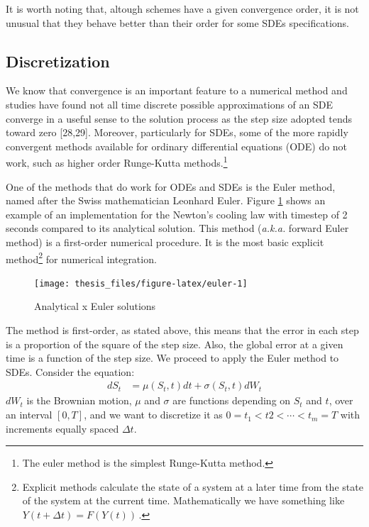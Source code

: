 \documentclass[12pt,twoside]{reedthesis}
\theoremstyle{definition}
\theoremstyle{definition}
\theoremstyle{remark}
\begin{document}
  It is worth noting that, altough schemes have a given convergence order,
  it is not unusual that they behave better than their order for some SDEs
  specifications.
  
  \subsection{Discretization}\label{discretization}
  
  We know that convergence is an important feature to a numerical method
  and studies have found not all time discrete possible approximations of
  an SDE converge in a useful sense to the solution process as the step
  size adopted tends toward zero {[}28,29{]}. Moreover, particularly for
  SDEs, some of the more rapidly convergent methods available for ordinary
  differential equations (ODE) do not work, such as higher order
  Runge-Kutta methods.\footnote{The euler method is the simplest
    Runge-Kutta method.}
  
  One of the methods that do work for ODEs and SDEs is the Euler method,
  named after the Swiss mathematician Leonhard Euler. Figure
  \ref{fig:euler} shows an example of an implementation for the Newton's
  cooling law with timestep of 2 seconds compared to its analytical
  solution. This method (\emph{a.k.a.} forward Euler method) is a
  first-order numerical procedure. It is the most basic explicit
  method\footnote{Explicit methods calculate the state of a system at a
    later time from the state of the system at the current time.
    Mathematically we have something like \(Y(t+\Delta t)=F(Y(t))\,\).}
  for numerical integration.
  \begin{figure}
  
  {\centering \texttt{[image: thesis\_files/figure-latex/euler-1]} 
  
  }
  
  \caption{Analytical x Euler solutions \label{euler}}\label{fig:euler}
  \end{figure}
  The method is first-order, as stated above, this means that the error in
  each step is a proportion of the square of the step size. Also, the
  global error at a given time is a function of the step size. We proceed
  to apply the Euler method to SDEs. Consider the equation:
  \begin{align}
  dS_t &= \mu(S_t,t) dt + \sigma(S_t,t) dW_t
  \end{align}
  \(dW_t\) is the Brownian motion, \(\mu\) and \(\sigma\) are functions
  depending on \(S_t\) and \(t\), over an interval \([0,T]\), and we want
  to discretize it as \(0 = t_1 < t2 < \cdots < t_m = T\) with increments
  equally spaced \(\Delta t\).
  
\end{document}

